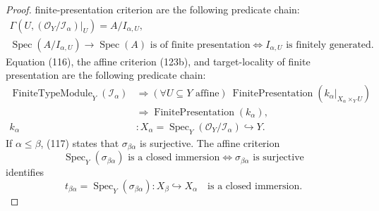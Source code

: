 \begin{proof}
  finite-presentation criterion are the following predicate chain:
  \[
  \begin{gathered}
    \Gamma\!\left(U,
      (\mathcal O_Y/\mathcal I_\alpha)|_U\right)=A/I_{\alpha,U},\\
    \operatorname{Spec}(A/I_{\alpha,U})\to\operatorname{Spec}(A)
      \text{ is of finite presentation}
      \Longleftrightarrow
    I_{\alpha,U}\text{ is finitely generated}.                  
  \end{gathered} \tag{123b}
  \]
  Equation (116), the affine criterion (123b), and target-locality of finite
  presentation are the following predicate chain:
  \[
  \begin{aligned}
    \operatorname{FiniteTypeModule}_Y(\mathcal I_\alpha)
      &\Longrightarrow
        (\forall U\subseteq Y\text{ affine})\ 
        \operatorname{FinitePresentation}
          (k_\alpha|_{X_\alpha\times_YU})\\
      &\Longrightarrow
        \operatorname{FinitePresentation}(k_\alpha),\\
    k_\alpha&\colon
      X_\alpha=\operatorname{Spec}_Y
        (\mathcal O_Y/\mathcal I_\alpha)\hookrightarrow Y.
  \end{aligned}                                                   \tag{124}
  \]
  If $\alpha\leq\beta$, (117) states that
  $\sigma_{\beta\alpha}$ is surjective.  The affine criterion
  \[
    \operatorname{Spec}_Y(\sigma_{\beta\alpha})
      \text{ is a closed immersion}
      \Longleftrightarrow
    \sigma_{\beta\alpha}\text{ is surjective}
  \]
  identifies
  \[
    t_{\beta\alpha}
      =\operatorname{Spec}_Y(\sigma_{\beta\alpha})\colon
        X_\beta\hookrightarrow X_\alpha
      \quad\text{is a closed immersion}.                       \tag{125}
  \]


\end{proof}
